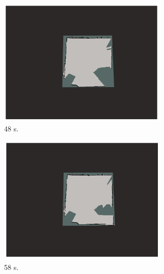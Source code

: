 \documentclass[11pt,openany]{book}
\begin{document}
\begin{algorimth}[H]
\begin{figure}[H]
\begin{subfigure}[H]{0.3\linewidth}
        \includegraphics[width=\linewidth]{assets/4_12_e.png}
        \caption{{48 s.}}
        \label{fig:4.12e}
    \end{subfigure}
    \begin{subfigure}[H]{0.3\linewidth}
        \includegraphics[width=\linewidth]{assets/4_12_f.png}
        \caption{{58 s.}}
        \label{fig:4.12f}
    \end{subfigure}
    \begin{subfigure}[H]{0.3\linewidth}

\end{subfigure}
\end{figure}
\end{algorimth}
\end{document}
